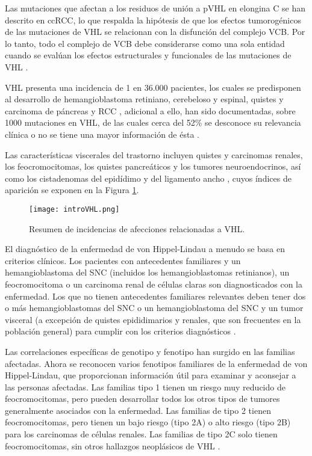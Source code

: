 Las mutaciones que afectan a los residuos de unión a pVHL en elongina C se han descrito en ccRCC, lo que respalda la hipótesis de que los efectos tumorogénicos de las mutaciones de VHL se relacionan con la disfunción del complejo VCB. Por lo tanto, todo el complejo de VCB debe considerarse como una sola entidad cuando se evalúan los efectos estructurales y funcionales de las mutaciones de VHL \cite{article}.

VHL presenta una incidencia de 1 en 36.000 pacientes, los cuales se predisponen al desarrollo de hemangioblastoma retiniano, cerebeloso y espinal, quistes y carcinoma de páncreas y RCC \cite{softwareVHL}, adicional a ello, han sido documentadas, sobre 1000 mutaciones en VHL, de las cuales cerca del 52\% se desconoce su relevancia clínica o no se tiene una mayor información de ésta \cite{article}. 

Las características viscerales del trastorno incluyen quistes y carcinomas renales, los feocromocitomas, los quistes pancreáticos y los tumores neuroendocrinos, así como los cistadenomas del epidídimo y del ligamento ancho \cite{LONSER20032059}, cuyos índices de aparición se exponen en la Figura \ref{introI1}.

\begin{figure}[!h]
	\centering
	\texttt{[image: introVHL.png]}
	\caption{Resumen de incidencias de afecciones relacionadas a VHL.}
	\label{introI1}
\end{figure}

El diagnóstico de la enfermedad de von Hippel-Lindau a menudo se basa en criterios clínicos. Los pacientes con antecedentes familiares y un hemangioblastoma del SNC (incluidos los hemangioblastomas retinianos), un feocromocitoma o un carcinoma renal de células claras son diagnosticados con la enfermedad. Los que no tienen antecedentes familiares relevantes deben tener dos o más hemangioblastomas del SNC o un hemangioblastoma del SNC y un tumor visceral (a excepción de quistes epididimarios y renales, que son frecuentes en la población general) para cumplir con los criterios diagnósticos \cite{vhlData, phillips1994neurological, LONSER20032059}.

Las correlaciones específicas de genotipo y fenotipo han surgido en las familias afectadas. Ahora se reconocen varios fenotipos familiares de la enfermedad de von Hippel-Lindau, que proporcionan información útil para examinar y aconsejar a las personas afectadas. Las familias tipo 1 tienen un riesgo muy reducido de feocromocitomas, pero pueden desarrollar todos los otros tipos de tumores generalmente asociados con la enfermedad. Las familias de tipo 2 tienen feocromocitomas, pero tienen un bajo riesgo (tipo 2A) o alto riesgo (tipo 2B) para los carcinomas de células renales. Las familias de tipo 2C solo tienen feocromocitomas, sin otros hallazgos neoplásicos de VHL \cite{LONSER20032059}.

